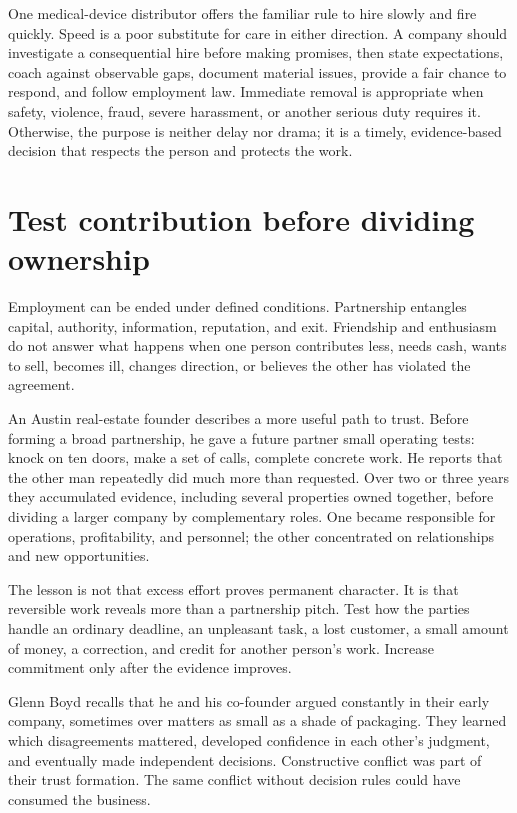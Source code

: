 One medical-device distributor offers the familiar rule to hire slowly and
fire quickly. Speed is a poor substitute for care in either direction. A
company should investigate a consequential hire before making promises, then
state expectations, coach against observable gaps, document material issues,
provide a fair chance to respond, and follow employment law. Immediate removal
is appropriate when safety, violence, fraud, severe harassment, or another
serious duty requires it. Otherwise, the purpose is neither delay nor drama;
it is a timely, evidence-based decision that respects the person and protects
the work.

\section{Test contribution before dividing ownership}

Employment can be ended under defined conditions. Partnership entangles
capital, authority, information, reputation, and exit. Friendship and enthusiasm
do not answer what happens when one person contributes less, needs cash, wants
to sell, becomes ill, changes direction, or believes the other has violated
the agreement.

An Austin real-estate founder describes a more useful path to trust. Before
forming a broad partnership, he gave a future partner small operating tests:
knock on ten doors, make a set of calls, complete concrete work. He reports
that the other man repeatedly did much more than requested. Over two or three
years they accumulated evidence, including several properties owned together,
before dividing a larger company by complementary roles. One became responsible
for operations, profitability, and personnel; the other concentrated on
relationships and new opportunities.

The lesson is not that excess effort proves permanent character. It is that
reversible work reveals more than a partnership pitch. Test how the parties
handle an ordinary deadline, an unpleasant task, a lost customer, a small
amount of money, a correction, and credit for another person's work. Increase
commitment only after the evidence improves.

Glenn Boyd recalls that he and his co-founder argued constantly in their early
company, sometimes over matters as small as a shade of packaging. They learned
which disagreements mattered, developed confidence in each other's judgment,
and eventually made independent decisions. Constructive conflict was part of
their trust formation. The same conflict without decision rules could have
consumed the business.

